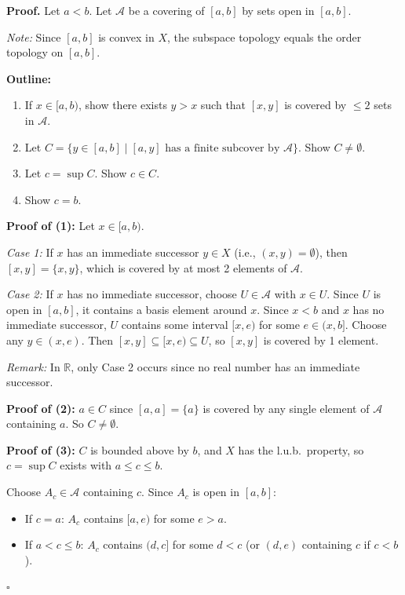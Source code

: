 \documentclass[11pt]{report}
\renewenvironment{proof}[1][Proof]{\noindent\textbf{#1.} }{\hfill$\square$\par\vspace{5pt}}
\begin{document}
\begin{proof}
Let $a < b$. Let $\mathcal{A}$ be a covering of $[a, b]$ by sets open in $[a, b]$.

\textit{Note:} Since $[a,b]$ is convex in $X$, the subspace topology equals the order topology on $[a,b]$.

\textbf{Outline:}
\begin{enumerate}
    \item If $x \in [a, b)$, show there exists $y > x$ such that $[x, y]$ is covered by $\leq 2$ sets in $\mathcal{A}$.
    \item Let $C = \{y \in [a, b] \mid [a, y] \text{ has a finite subcover by } \mathcal{A}\}$. Show $C \neq \emptyset$.
    \item Let $c = \sup C$. Show $c \in C$.
    \item Show $c = b$.
\end{enumerate}

\textbf{Proof of (1):} Let $x \in [a, b)$. 

\textit{Case 1:} If $x$ has an immediate successor $y \in X$ (i.e., $(x,y) = \emptyset$), then $[x, y] = \{x, y\}$, which is covered by at most 2 elements of $\mathcal{A}$.

\textit{Case 2:} If $x$ has no immediate successor, choose $U \in \mathcal{A}$ with $x \in U$. Since $U$ is open in $[a,b]$, it contains a basis element around $x$. Since $x < b$ and $x$ has no immediate successor, $U$ contains some interval $[x, e)$ for some $e \in (x, b]$. Choose any $y \in (x, e)$. Then $[x, y] \subseteq [x, e) \subseteq U$, so $[x,y]$ is covered by 1 element.

\textit{Remark:} In $\mathbb{R}$, only Case 2 occurs since no real number has an immediate successor.

\textbf{Proof of (2):} $a \in C$ since $[a, a] = \{a\}$ is covered by any single element of $\mathcal{A}$ containing $a$. So $C \neq \emptyset$.

\textbf{Proof of (3):} $C$ is bounded above by $b$, and $X$ has the l.u.b.\ property, so $c = \sup C$ exists with $a \leq c \leq b$.

Choose $A_c \in \mathcal{A}$ containing $c$. Since $A_c$ is open in $[a,b]$:
\begin{itemize}
    \item If $c = a$: $A_c$ contains $[a, e)$ for some $e > a$.
    \item If $a < c \leq b$: $A_c$ contains $(d, c]$ for some $d < c$ (or $(d, e)$ containing $c$ if $c < b$).
\end{itemize}


\end{proof}
\end{document}
